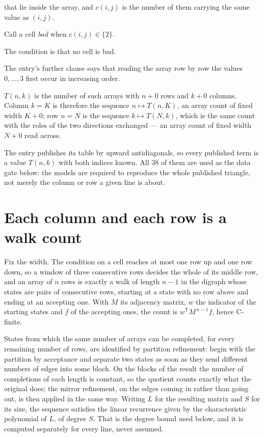 \documentclass[11pt]{article}
\theoremstyle{definition}
\begin{document}
that lie inside the array, and $c(i,j)$ is the number of them carrying the same value as $(i,j)$.

Call a cell {\itshape bad} when $c(i,j) \in \{2\}$.

The condition is that no cell is bad.

The entry's further clause says that reading the array row by row the values $0,\dots,3$ first occur in increasing order.

$T(n,k)$ is the number of such arrays with $n + 0$ rows and $k + 0$ columns. Column $k = K$ is therefore the sequence $n \mapsto T(n,K)$, an array count of fixed width $K + 0$; row $n = N$ is the sequence $k \mapsto T(N,k)$, which is the same count with the roles of the two directions exchanged --- an array count of fixed width $N + 0$ read across.

The entry publishes its table by upward antidiagonals, so every published term is a value $T(n,k)$ with both indices known. All 38 of them are used as the data gate below: the models are required to reproduce the whole published triangle, not merely the column or row a given line is about.

\section{Each column and each row is a walk count}

Fix the width. The condition on a cell reaches at most one row up and one row down, so a window of three consecutive rows decides the whole of its middle row, and an array of $n$ rows is exactly a walk of length $n-1$ in the digraph whose states are pairs of consecutive rows, starting at a state with no row above and ending at an accepting one. With $M$ its adjacency matrix, $w$ the indicator of the starting states and $f$ of the accepting ones, the count is $w^{\mathsf T}M^{\,n-1}f$, hence C-finite.

States from which the same number of arrays can be completed, for every remaining number of rows, are identified by partition refinement: begin with the partition by acceptance and separate two states as soon as they send different numbers of edges into some block. On the blocks of the result the number of completions of each length is constant, so the quotient counts exactly what the original does; the mirror refinement, on the edges coming in rather than going out, is then applied in the same way. Writing $L$ for the resulting matrix and $S$ for its size, the sequence satisfies the linear recurrence given by the characteristic polynomial of $L$, of degree $S$. That is the degree bound used below, and it is computed separately for every line, never assumed.
\end{document}
